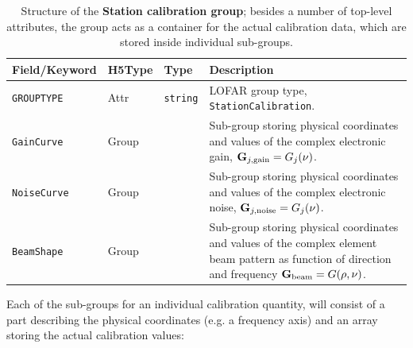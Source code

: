 \documentclass[a4paper,10pt,bibtotoc]{scrartcl}
\begin{document}
\begin{table}[ht]
  \centering
  \begin{tabular}{|lllp{9cm}|}
    \hline
    \sc Field/Keyword & \sc H5Type & \sc Type & Description \\
    \hline \hline
    \verb|GROUPTYPE|        & Attr & \verb|string| & LOFAR group type,
    \texttt{StationCalibration}. \\
    \verb|GainCurve|       & Group &   & Sub-group storing physical coordinates
    and values of the complex electronic gain, $\mathbf G_{j,\rm gain} = G_{j}(\nu)$. \\
    \verb|NoiseCurve|      & Group &   & Sub-group storing physical coordinates
    and values of the complex electronic noise, $\mathbf G_{j,\rm noise} = G_{j}(\nu)$. \\
    \verb|BeamShape|       & Group &   & Sub-group storing physical coordinates
    and values of the complex element beam pattern as function of direction
    and frequency $\mathbf G_{\rm beam} = G (\vec \rho, \nu)$. \\
    \hline
  \end{tabular}
  \caption{Structure of the \textbf{Station calibration group};
    besides a number of top-level attributes, the group acts as a
    container for the actual calibration data, which are stored inside
    individual sub-groups.}
  \label{tab:station calibration group}
\end{table}

Each of the sub-groups for an individual calibration quantity, will consist of
a part describing the physical coordinates (e.g. a frequency axis) and an array
storing the actual calibration values:
\end{document}
